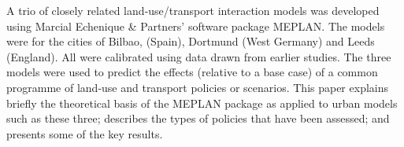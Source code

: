 A trio of closely related land‐use/transport interaction models was developed using Marcial Echenique \& Partners’ software package MEPLAN. The models were for the cities of Bilbao, (Spain), Dortmund (West Germany) and Leeds (England). All were calibrated using data drawn from earlier studies. The three models were used to predict the effects (relative to a base case) of a common programme of land‐use and transport policies or scenarios. This paper explains briefly the theoretical basis of the MEPLAN package as applied to urban models such as these three; describes the types of policies that have been assessed; and presents some of the key results.
